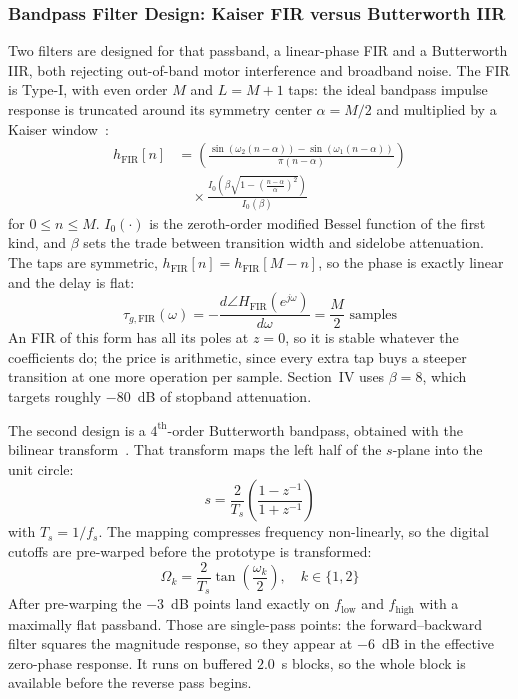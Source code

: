 \subsubsection{Bandpass Filter Design: Kaiser FIR versus Butterworth IIR}
Two filters are designed for that passband, a linear-phase FIR and a
Butterworth IIR, both rejecting out-of-band motor interference and broadband
noise. The FIR is Type-I, with even order $M$ and $L = M + 1$ taps: the ideal
bandpass impulse response is truncated around its symmetry center $\alpha = M/2$
and multiplied by a Kaiser window~\cite{oppenheim}:
\begin{equation}
\begin{split}
  h_{\text{FIR}}[n] &= \left( \frac{\sin(\omega_2(n - \alpha)) -
  \sin(\omega_1(n - \alpha))}{\pi(n - \alpha)} \right) \\
  &\quad \times \frac{I_0\!\left(\beta \sqrt{1 -
  \left(\frac{n - \alpha}{\alpha}\right)^2}\right)}{I_0(\beta)}
\end{split}
\end{equation}
for $0 \le n \le M$. $I_0(\cdot)$ is the zeroth-order modified Bessel function
of the first kind, and $\beta$ sets the trade between transition width and
sidelobe attenuation. The taps are symmetric,
$h_{\text{FIR}}[n] = h_{\text{FIR}}[M - n]$, so the phase is exactly linear and
the delay is flat:
\begin{equation}
  \tau_{g,\text{FIR}}(\omega) =
  -\frac{d\angle H_{\text{FIR}}(e^{j\omega})}{d\omega} = \frac{M}{2}
  \text{ samples}
\end{equation}
An FIR of this form has all its poles at $z = 0$, so it is stable whatever the
coefficients do; the price is arithmetic, since every extra tap buys a steeper
transition at one more operation per sample. Section~IV uses $\beta = 8$, which
targets roughly $-80$~dB of stopband attenuation.

The second design is a $4^{\text{th}}$-order Butterworth bandpass, obtained with
the bilinear transform~\cite{proakis}. That transform maps the left half of the $s$-plane into
the unit circle:
\begin{equation}
  s = \frac{2}{T_s}\left(\frac{1 - z^{-1}}{1 + z^{-1}}\right)
\end{equation}
with $T_s = 1/f_s$. The mapping compresses frequency non-linearly, so the
digital cutoffs are pre-warped before the prototype is transformed:
\begin{equation}
  \Omega_k = \frac{2}{T_s} \tan\!\left(\frac{\omega_k}{2}\right),
  \quad k \in \{1, 2\}
\end{equation}
After pre-warping the $-3$~dB points land exactly on $f_{\text{low}}$ and
$f_{\text{high}}$ with a maximally flat passband. Those are single-pass points:
the forward--backward filter squares the magnitude response, so they appear at
$-6$~dB in the effective zero-phase response. It runs on buffered $2.0$~s
blocks, so the whole block is available before the reverse pass begins.

